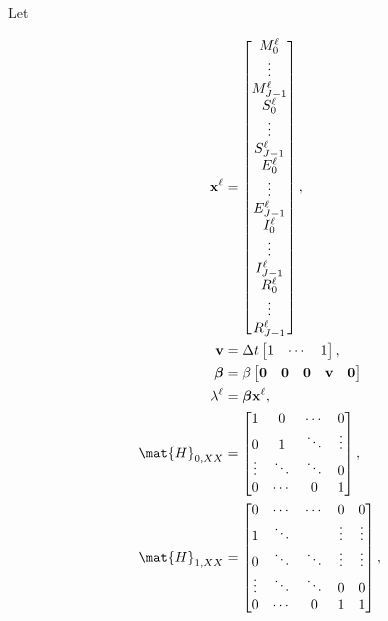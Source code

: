 \documentclass{jpmarticle}
\renewcommand{\vec}[1]{\boldsymbol{\mathrm{#1}}}
\let\subequationsorig\subequations%
\let\endsubequationsorig\endsubequations%
\renewenvironment{subequations}{
  \subequationsorig
  \renewcommand{\theequation}{\theparentequation.\arabic{equation}}
}{
  \endsubequationsorig
}
\begin{document}
Let
\begin{subequations}
  \begin{align}
    \vec{x}^{\ell} &=
    \begin{bmatrix}
      M_0^{\ell} \\ \vdots \\ M_{J - 1}^{\ell} \\
      S_0^{\ell} \\ \vdots \\ S_{J - 1}^{\ell} \\
      E_0^{\ell} \\ \vdots \\ E_{J - 1}^{\ell} \\
      I_0^{\ell} \\ \vdots \\ I_{J - 1}^{\ell} \\
      R_0^{\ell} \\ \vdots \\ R_{J - 1}^{\ell}
    \end{bmatrix},
    \\
    \vec{v} &=
    \Delta t
    \begin{bmatrix}
      1 & \cdots & 1
    \end{bmatrix},
    \\
    \vec{\beta} &=
    \beta
    \begin{bmatrix}
      \vec{0} & \vec{0} & \vec{0} & \vec{v} & \vec{0}
    \end{bmatrix}
    \\
    \lambda^{\ell} &=
    \vec{\beta} \vec{x}^{\ell},
    \\
    \mat{H}_{0, XX} &=
    \begin{bmatrix}
      1 & 0 & \cdots & 0 \\
      0 & 1 & \ddots & \vdots \\
      \vdots & \ddots & \ddots & 0 \\
      0 & \cdots & 0 & 1
    \end{bmatrix},
    \\
    \mat{H}_{1, XX} &=
    \begin{bmatrix}
      0 & \cdots & \cdots & 0 & 0 \\
      1 & \ddots & & \vdots & \vdots \\
      0 & \ddots & \ddots & \vdots & \vdots \\
      \vdots & \ddots & \ddots & 0 & 0 \\
      0 & \cdots & 0 & 1 & 1
    \end{bmatrix},

\end{align}
\end{subequations}
\end{document}
